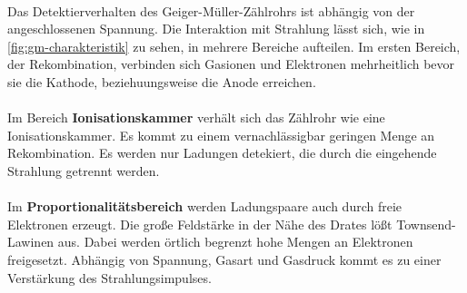 \\
Das Detektierverhalten des Geiger-Müller-Zählrohrs ist abhängig von der angeschlossenen Spannung.
Die Interaktion mit Strahlung lässt sich, wie in \autoref{fig:gm-charakteristik} zu sehen, in mehrere Bereiche aufteilen.
Im ersten Bereich, der Rekombination, verbinden sich Gasionen und Elektronen 
mehrheitlich bevor sie die Kathode, beziehuungsweise die Anode erreichen. 
\\
\\
Im Bereich \textbf{Ionisationskammer} verhält sich das Zählrohr wie eine Ionisationskammer.
Es kommt zu einem vernachlässigbar geringen Menge an Rekombination.
Es werden nur Ladungen detekiert, die durch die eingehende Strahlung getrennt werden.
\\
\\
Im \textbf{Proportionalitätsbereich} werden Ladungspaare auch durch freie Elektronen erzeugt.
Die große Feldstärke in der Nähe des Drates lößt Townsend-Lawinen aus. Dabei werden örtlich begrenzt hohe Mengen an Elektronen freigesetzt.
Abhängig von Spannung, Gasart und Gasdruck kommt es zu einer Verstärkung des Strahlungsimpulses.%
\\
\\